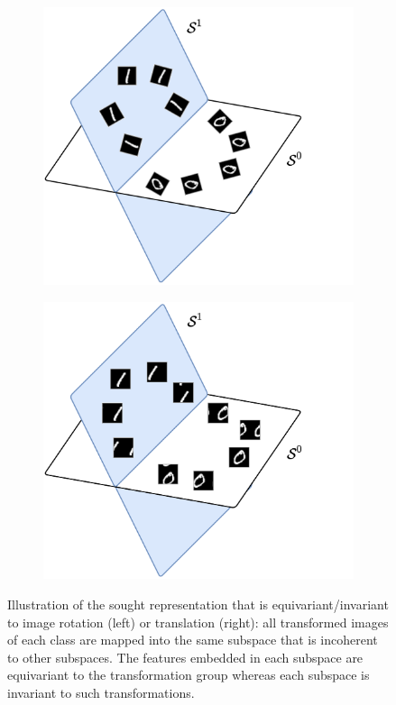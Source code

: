 \documentclass[../../book-main.tex]{subfiles}
\begin{document}
\begin{figure}[t]
    \begin{subfigure}[t]{0.4\textwidth}
        \centering 
        \includegraphics[width=\textwidth]{figs_chap4/ortho_diagram_1d.pdf}
    \end{subfigure}
    \hfill 
    \begin{subfigure}[t]{0.4\textwidth}
        \centering 
        \includegraphics[width=\textwidth]{figs_chap4/ortho_diagram_2d.pdf}
    \end{subfigure}
    \caption{Illustration of the sought representation that is equivariant/invariant to image rotation (left) or translation (right): all transformed images of each class are mapped into the same subspace that is incoherent to other subspaces. The features embedded in each subspace are equivariant to the transformation group whereas each subspace is invariant to such transformations.}\label{fig:ortho-invariance-diagram} 
\end{figure}
\end{document}
